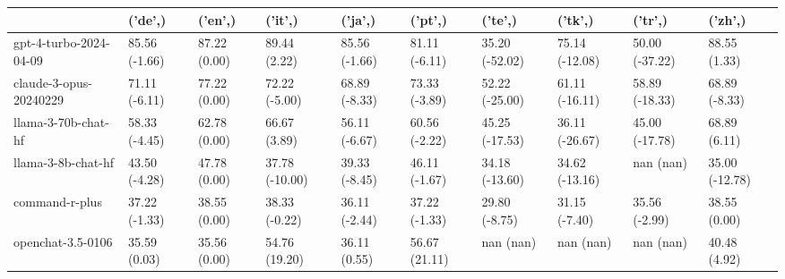 \begin{tabular}{llllllllll}
\toprule
 & ('de',) & ('en',) & ('it',) & ('ja',) & ('pt',) & ('te',) & ('tk',) & ('tr',) & ('zh',) \\
\midrule
gpt-4-turbo-2024-04-09 & 85.56 (-1.66) & 87.22 (0.00) & 89.44 (2.22) & 85.56 (-1.66) & 81.11 (-6.11) & 35.20 (-52.02) & 75.14 (-12.08) & 50.00 (-37.22) & 88.55 (1.33) \\
claude-3-opus-20240229 & 71.11 (-6.11) & 77.22 (0.00) & 72.22 (-5.00) & 68.89 (-8.33) & 73.33 (-3.89) & 52.22 (-25.00) & 61.11 (-16.11) & 58.89 (-18.33) & 68.89 (-8.33) \\
llama-3-70b-chat-hf & 58.33 (-4.45) & 62.78 (0.00) & 66.67 (3.89) & 56.11 (-6.67) & 60.56 (-2.22) & 45.25 (-17.53) & 36.11 (-26.67) & 45.00 (-17.78) & 68.89 (6.11) \\
llama-3-8b-chat-hf & 43.50 (-4.28) & 47.78 (0.00) & 37.78 (-10.00) & 39.33 (-8.45) & 46.11 (-1.67) & 34.18 (-13.60) & 34.62 (-13.16) & nan (nan) & 35.00 (-12.78) \\
command-r-plus & 37.22 (-1.33) & 38.55 (0.00) & 38.33 (-0.22) & 36.11 (-2.44) & 37.22 (-1.33) & 29.80 (-8.75) & 31.15 (-7.40) & 35.56 (-2.99) & 38.55 (0.00) \\
openchat-3.5-0106 & 35.59 (0.03) & 35.56 (0.00) & 54.76 (19.20) & 36.11 (0.55) & 56.67 (21.11) & nan (nan) & nan (nan) & nan (nan) & 40.48 (4.92) \\
\bottomrule
\end{tabular}
